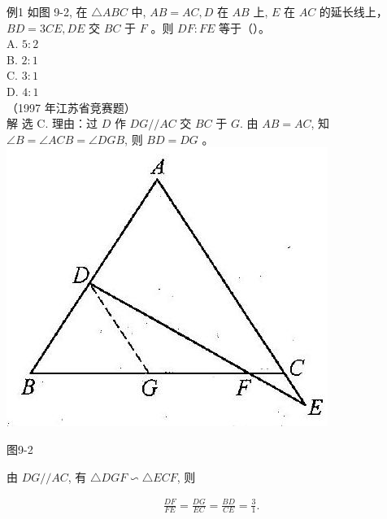 \documentclass[10pt]{article}
\begin{document}
例1 如图 9-2, 在 $\triangle A B C$ 中, $A B=A C, D$ 在 $A B$ 上, $E$ 在 $A C$ 的延长线上， $B D=3 C E, D E$ 交 $B C$ 于 $F$ 。则 $D F: F E$ 等于（）。\\
A. $5: 2$\\
B. $2: 1$\\
C. $3: 1$\\
D. $4: 1$\\
（1997 年江苏省竞赛题）\\
解 选 C. 理由：过 $D$ 作 $D G / / A C$ 交 $B C$ 于 $G$. 由 $A B=A C$, 知 $\angle B=\angle A C B=\angle D G B$, 则 $B D=D G$ 。\\
\includegraphics[max width=\textwidth, center]{2024_10_30_2c8f45efd4a519b08e1ag-090(1)}

图9-2

由 $D G / / A C$, 有 $\triangle D G F \backsim \triangle E C F$, 则

\begin{align*}
\frac{D F}{F E}=\frac{D G}{E C}=\frac{B D}{C E}=\frac{3}{1} .
\end{align*}
\end{document}
